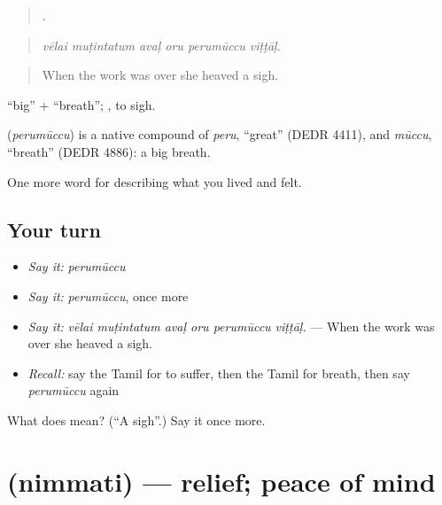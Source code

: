 \begin{quote}
     .
\end{quote}

\begin{quote}
\emph{vēlai muṭintatum avaḷ oru perumūccu viṭṭāḷ.}
\end{quote}

\begin{quote}
When the work was over she heaved a sigh.
\end{quote}

 \textquotedblleft{}big\textquotedblright{} +  \textquotedblleft{}breath\textquotedblright{};  , to sigh.

\begin{cousinweb}
\textbf{} (\emph{perumūccu}) is a native compound of  \emph{peru}, \textquotedblleft{}great\textquotedblright{} (DEDR 4411), and  \emph{mūccu}, \textquotedblleft{}breath\textquotedblright{} (DEDR 4886): a big breath.
\end{cousinweb}

\begin{grammarlens}[title={What you've built}]
One more word for describing what you lived and felt.
\end{grammarlens}

\subsection*{Your turn}
\begin{itemize}
\raggedright
  \item \emph{Say it:} \emph{perumūccu}
  \item \emph{Say it:} \emph{perumūccu}, once more
  \item \emph{Say it:} \emph{vēlai muṭintatum avaḷ oru perumūccu viṭṭāḷ.} — When the work was over she heaved a sigh.
  \item \emph{Recall:} say the Tamil for to suffer, then the Tamil for breath, then say \emph{perumūccu} again
\end{itemize}

\begin{tcolorbox}[breakable,colback=teal!4,colframe=teal!35!black,title={Before you move on}]
What does  mean? (\textquotedblleft{}A sigh\textquotedblright{}.) Say it once more.
\end{tcolorbox}
\section[\texorpdfstring{\ta{நிம்மதி} (nimmati)}{நிம்மதி (nimmati)}]{ (nimmati) — relief; peace of mind}

